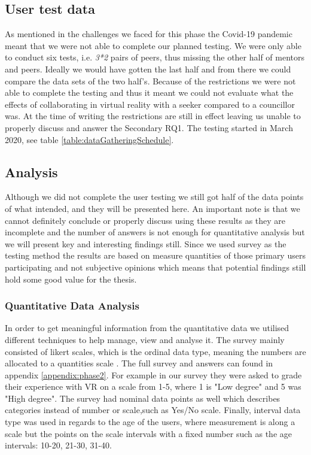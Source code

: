 \subsection{User test data}
As mentioned in the challenges we faced for this phase the Covid-19 pandemic meant that we were not able to complete our planned testing. We were only able to conduct six tests, i.e. \textit{3*2} pairs of peers, thus missing the other half of mentors and peers. Ideally we would have gotten the last half and from there we could  compare the data sets of the two half's. Because of the restrictions we were not able to complete the testing and thus it meant we could not evaluate what the effects of collaborating in virtual reality with a seeker compared to a councillor was. At the time of writing the restrictions are still in effect leaving us unable to properly discuss and answer the Secondary RQ1. The testing started in March 2020, see table \ref{table:dataGatheringSchedule}.     


\subsection{Analysis}
Although we did not complete the user testing we still got half of the data points of what intended, and they will be presented here. An important note is that we cannot definitely conclude or properly discuss using these results as they are incomplete and the number of answers is not enough for quantitative analysis but we will present key and interesting findings still. Since we used survey as the testing method the results are based on measure quantities of those primary users participating and not subjective opinions which means that potential findings still hold some good value for the thesis.       

\subsubsection{Quantitative Data Analysis}
In order to get meaningful information from the quantitative data we utilised different techniques to help manage, view and analyse it. The survey mainly consisted of likert scales, which is the ordinal data type, meaning the numbers are allocated to a quantities scale \cite{oates2005researching}. The full survey and answers can found in appendix \ref{appendix:phase2}. For example in our survey they were asked to grade their experience with VR on a scale from 1-5, where 1 is "Low degree" and 5 was "High degree". The survey had nominal data points as well which describes categories instead of number or scale,such as Yes/No scale. Finally, interval data type was used in regards to the age of the users, where measurement is along a scale but the points on the scale intervals with a fixed number such as the age intervals: 10-20, 21-30, 31-40. 

